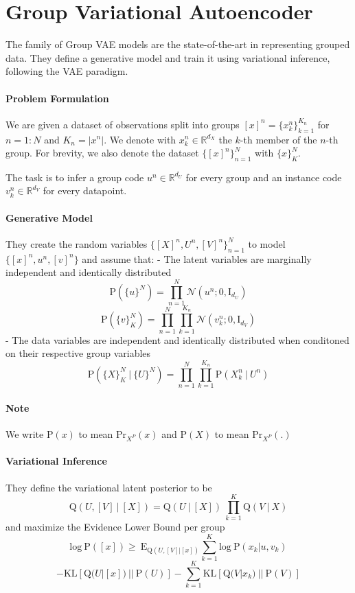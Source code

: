 \documentclass{article}
\begin{document}
\section{Group Variational Autoencoder}

The family of Group VAE models \citep{Bouchacourt2018MultiLevelVA, Hosoya2019GroupbasedLO, Nmeth2020AdversarialDW} are the state-of-the-art in representing grouped data. They define a generative model and train it using variational inference, following the VAE paradigm.

\paragraph{Problem Formulation}
We are given a dataset of observations split into groups $[x]^n = \{x_k^n\}_{k=1}^{K_n}$ for $n = 1:N$ and $K_n = |x^n|$. We denote with $x_k^n \in \mathbb{R}^{d_X}$ the $k$-th member of the $n$-th group. For brevity, we also denote the dataset $\{[x]^n\}_{n=1}^N$ with $\{x\}_K^N$.

The task is to infer a group code $u^n \in \mathbb{R}^{d_U}$ for every group and an instance code $v^n_k \in \mathbb{R}^{d_V}$ for every datapoint.

\paragraph{Generative Model}
They create the random variables $\{[X]^n, U^n, [V]^n\}_{n=1}^{N}$ to model $\{[x]^n, u^n, [v]^n\}$ and assume that:
- The latent variables are marginally independent and identically distributed $$\textrm{P} (\{u\}^N) = \prod_{n=1}^N \mathcal{N}(u^n; 0, \textrm{I}_{d_U})$$$$\textrm{P}(\{v\}_K^N) = \prod_{n=1}^N \prod_{k=1}^{K_n} \mathcal{N}(v_k^n; 0, \textrm{I}_{d_V})$$
- The data variables are independent and identically distributed when conditoned on their respective group variables $$\textrm{P} (\{X\}_K^N ~|~ \{U\}^N) = \prod_{n=1}^N \prod_{k=1}^{K_n} \textrm{P}(X_k^n ~|~ U^n)$$

\paragraph{Note} We write $\textrm{P}(x)$ to mean $\textrm{Pr}_{X^P}(x)$ and $\textrm{P}(X)$ to mean $\textrm{Pr}_{X^P}(.)$

\paragraph{Variational Inference}
They define the variational latent posterior to be $$\textrm{Q} (U, [V] ~|~ [X]) = \textrm{Q} (U ~|~ [X]) ~ \prod_{k=1}^K \textrm{Q} (V ~|~ X)$$ and maximize the Evidence Lower Bound per group $$\textrm{log} ~ \textrm{P} ([x]) \geq~ \textrm{E}_{\textrm{Q} (U, [V] | [x])} \sum_{k=1}^{K} \textrm{log} ~ \textrm{P}(x_k|u, v_k)$$ $$- \textrm{KL} [\textrm{Q}(U|[x]) ~||~ \textrm{P}(U)] - \sum_{k=1}^{K} \textrm{KL} [\textrm{Q}(V|x_k) ~||~ \textrm{P}(V)]$$
\end{document}
